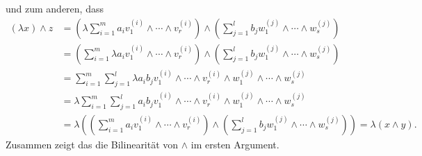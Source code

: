 und zum anderen, dass
\begin{align*}
    (\lambda x) \wedge z
  &=  \left(
        \lambda
        \sum_{i=1}^m a_i v^{(i)}_1 \wedge \dotsb \wedge v^{(i)}_r
      \right)
      \wedge
      \left(
        \sum_{j=1}^l b_j w^{(j)}_1 \wedge \dotsb \wedge w^{(j)}_s
      \right)
  \\
  &=  \left(
        \sum_{i=1}^m \lambda a_i v^{(i)}_1 \wedge \dotsb \wedge v^{(i)}_r
      \right)
      \wedge
      \left(
        \sum_{j=1}^l b_j w^{(j)}_1 \wedge \dotsb \wedge w^{(j)}_s
      \right)
  \\
  &=  \sum_{i=1}^m \sum_{j=1}^l \lambda a_i b_j
                               v^{(i)}_1 \wedge \dotsb \wedge v^{(i)}_r \wedge w^{(j)}_1 \wedge \dotsb \wedge w^{(j)}_s
  \\
  &=  \lambda \sum_{i=1}^m \sum_{j=1}^l a_i b_j
                               v^{(i)}_1 \wedge \dotsb \wedge v^{(i)}_r \wedge w^{(j)}_1 \wedge \dotsb \wedge w^{(j)}_s
  \\  
  &=  \lambda \left(
                \left(
                  \sum_{i=1}^m a_i v^{(i)}_1 \wedge \dotsb \wedge v^{(i)}_r
                \right)
                \wedge
                \left(
                  \sum_{j=1}^l b_j w^{(j)}_1 \wedge \dotsb \wedge w^{(j)}_s
                \right)
              \right)
  = \lambda (x \wedge y).
\end{align*}
Zusammen zeigt das die Bilinearität von $\wedge$ im ersten Argument.

